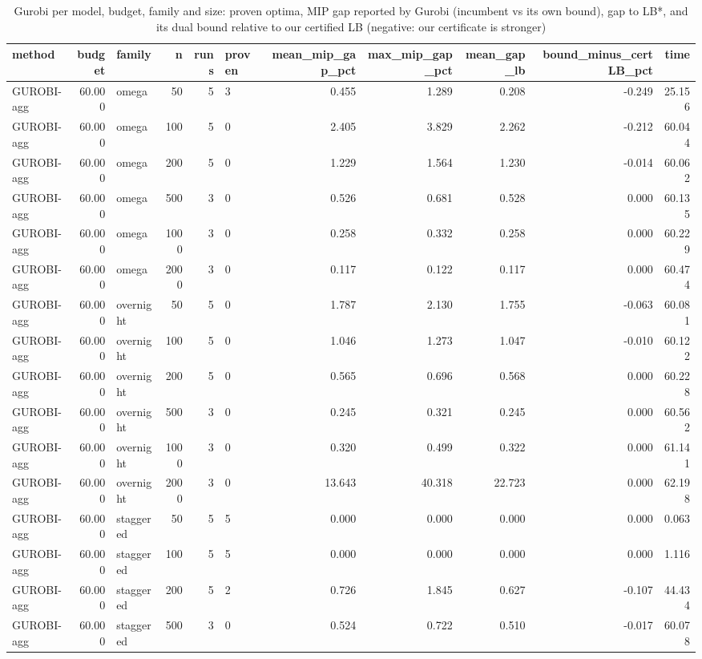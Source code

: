 \begin{table}[htbp]
\centering
\small
\caption{Gurobi per model, budget, family and size: proven optima, MIP gap reported by Gurobi (incumbent vs its own bound), gap to LB*, and its dual bound relative to our certified LB (negative: our certificate is stronger)}
\label{tab:E4b_equal_budgets_60s_gurobi}
\begin{tabular}{lrlrrlrrrrr}
\toprule
method & budget & family & n & runs & proven & mean\_mip\_gap\_pct & max\_mip\_gap\_pct & mean\_gap\_lb & bound\_minus\_certLB\_pct & time \\
\midrule
GUROBI-agg & 60.000 & omega & 50 & 5 & 3 & 0.455 & 1.289 & 0.208 & -0.249 & 25.156 \\
GUROBI-agg & 60.000 & omega & 100 & 5 & 0 & 2.405 & 3.829 & 2.262 & -0.212 & 60.044 \\
GUROBI-agg & 60.000 & omega & 200 & 5 & 0 & 1.229 & 1.564 & 1.230 & -0.014 & 60.062 \\
GUROBI-agg & 60.000 & omega & 500 & 3 & 0 & 0.526 & 0.681 & 0.528 & 0.000 & 60.135 \\
GUROBI-agg & 60.000 & omega & 1000 & 3 & 0 & 0.258 & 0.332 & 0.258 & 0.000 & 60.229 \\
GUROBI-agg & 60.000 & omega & 2000 & 3 & 0 & 0.117 & 0.122 & 0.117 & 0.000 & 60.474 \\
GUROBI-agg & 60.000 & overnight & 50 & 5 & 0 & 1.787 & 2.130 & 1.755 & -0.063 & 60.081 \\
GUROBI-agg & 60.000 & overnight & 100 & 5 & 0 & 1.046 & 1.273 & 1.047 & -0.010 & 60.122 \\
GUROBI-agg & 60.000 & overnight & 200 & 5 & 0 & 0.565 & 0.696 & 0.568 & 0.000 & 60.228 \\
GUROBI-agg & 60.000 & overnight & 500 & 3 & 0 & 0.245 & 0.321 & 0.245 & 0.000 & 60.562 \\
GUROBI-agg & 60.000 & overnight & 1000 & 3 & 0 & 0.320 & 0.499 & 0.322 & 0.000 & 61.141 \\
GUROBI-agg & 60.000 & overnight & 2000 & 3 & 0 & 13.643 & 40.318 & 22.723 & 0.000 & 62.198 \\
GUROBI-agg & 60.000 & staggered & 50 & 5 & 5 & 0.000 & 0.000 & 0.000 & 0.000 & 0.063 \\
GUROBI-agg & 60.000 & staggered & 100 & 5 & 5 & 0.000 & 0.000 & 0.000 & 0.000 & 1.116 \\
GUROBI-agg & 60.000 & staggered & 200 & 5 & 2 & 0.726 & 1.845 & 0.627 & -0.107 & 44.434 \\
GUROBI-agg & 60.000 & staggered & 500 & 3 & 0 & 0.524 & 0.722 & 0.510 & -0.017 & 60.078 \\

\end{tabular}
\end{table}
